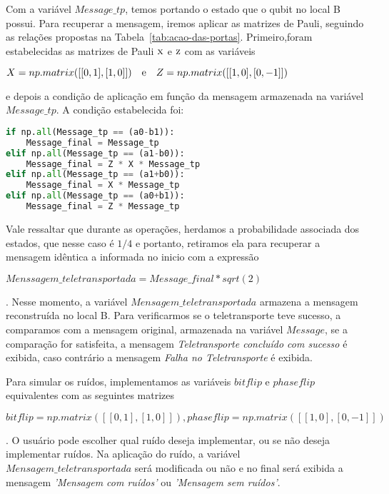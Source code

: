 Com a variável \textit{$Message\_tp$}, temos portando o estado que o qubit no local B possui. Para recuperar a mensagem, iremos aplicar as matrizes de Pauli, seguindo as relações propostas na Tabela~\ref{tab:acao-das-portas}. Primeiro,foram estabelecidas as matrizes de Pauli \(\operatorname{\textsc{x}}\) e \(\operatorname{\textsc{z}}\) com as variáveis \begin{tiny}\textbf{$X = np.matrix([[0, 1], [1, 0]]) \quad \text e \quad Z = np.matrix([[1, 0], [0, -1]])$}\end{tiny} e depois a condição de aplicação em função da mensagem armazenada na variável \textit{$Message\_tp$}. A condição estabelecida foi:

\begin{center}
\begin{lstlisting}[language=Python, caption=Relação de condição para aplicação das portas de Pauli.]
if np.all(Message_tp == (a0-b1)):
    Message_final = Message_tp
elif np.all(Message_tp == (a1-b0)):
    Message_final = Z * X * Message_tp 
elif np.all(Message_tp == (a1+b0)):
    Message_final = X * Message_tp 
elif np.all(Message_tp == (a0+b1)):
    Message_final = Z * Message_tp 
\end{lstlisting}
\end{center}

Vale ressaltar que durante as operações, herdamos a probabilidade associada dos estados, que nesse caso é $1/4$ e portanto, retiramos ela para recuperar a mensagem idêntica a informada no inicio com a expressão \begin{tiny}\textbf{$Menssagem\_teletransportada = Message\_final*sqrt(2)$}\end{tiny}. Nesse momento, a variável \textit{$Mensagem\_teletransportada$} armazena a mensagem reconstruída no local B. Para verificarmos se o teletransporte teve sucesso, a comparamos com a mensagem original, armazenada na variável \textit{$Message$}, se a comparação for satisfeita, a mensagem \textit{Teletransporte concluído com sucesso} é exibida, caso contrário a mensagem \textit{Falha no Teletransporte} é exibida.

Para simular os ruídos, implementamos as variáveis \textit{$bitflip$}	e \textit{$phaseflip$} equivalentes com as seguintes matrizes\begin{tiny}\textbf{$bitflip = np.matrix([[0, 1], [1, 0]]), phaseflip = np.matrix([[1, 0], [0, -1]])$}\end{tiny}. O usuário pode escolher qual ruído deseja implementar, ou se não deseja implementar ruídos.
Na aplicação do ruído, a variável \textit{$Mensagem\_teletransportada$} será modificada ou não e no final será exibida a mensagem \textit{'Mensagem com ruídos'} ou \textit{'Mensagem sem ruídos'}.

